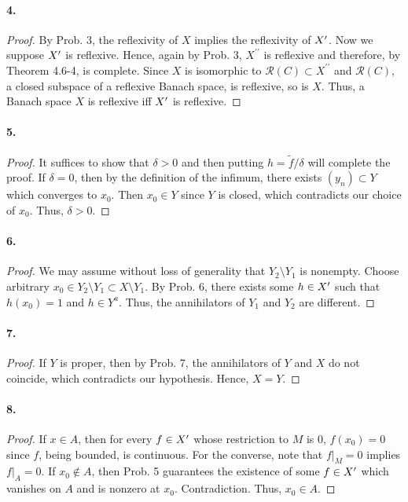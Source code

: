   \paragraph{4.}
  \begin{proof}
    By Prob. 3, the reflexivity of $X$ implies the reflexivity of $X^\prime$. Now we 
    suppose $X^\prime$ is reflexive. Hence, again by Prob. 3, $X^{\prime\prime}$ is
    reflexive and therefore, by Theorem 4.6-4, is complete. Since $X$ is 
    isomorphic to $\mathcal{R}(C)\subset X^{\prime\prime}$ and $\mathcal{R}(C)$,
    a closed subspace of a reflexive Banach space, is reflexive, so is $X$. 
    Thus, a Banach space $X$ is reflexive iff $X^\prime$ is reflexive.
  \end{proof}
  
  \paragraph{5.}
  \begin{proof}
    It suffices to show that $\delta>0$ and then putting $h=\tilde{f}/\delta$
    will complete the proof. If $\delta=0$, then by the definition of the 
    infimum, there exists $(y_n)\subset Y$ which converges to $x_0$. Then $x_0
    \in Y$ since $Y$ is closed, which contradicts our choice of $x_0$. Thus,
    $\delta>0$. 
  \end{proof}
  
  \paragraph{6.}
  \begin{proof}
    We may assume without loss of generality that $Y_2\setminus Y_1$ is 
    nonempty. Choose arbitrary $x_0\in Y_2\setminus Y_1\subset X\setminus Y_1$.
    By Prob. 6, there exists some $h\in X^\prime$ such that $h(x_0)=1$ and $h\in
    Y^a$. Thus, the annihilators of $Y_1$ and $Y_2$ are different.
  \end{proof}
  
  \paragraph{7.}
  \begin{proof}
    If $Y$ is proper, then by Prob. 7, the annihilators of $Y$ and $X$ do not
    coincide, which contradicts our hypothesis. Hence, $X=Y$.
  \end{proof}
  
  \paragraph{8.}
  \begin{proof}
    If $x\in A$, then for every $f\in X^\prime$ whose restriction to $M$ is $0$, 
    $f(x_0)=0$ since $f$, being bounded, is continuous. For the converse, note
    that $f|_M=0$ implies $f|_A=0$. If $x_0\notin A$, then Prob. 5 guarantees
    the existence of some $f\in X^\prime$ which vanishes on $A$ and is nonzero at
    $x_0$. Contradiction. Thus, $x_0\in A$.
  \end{proof}
  
